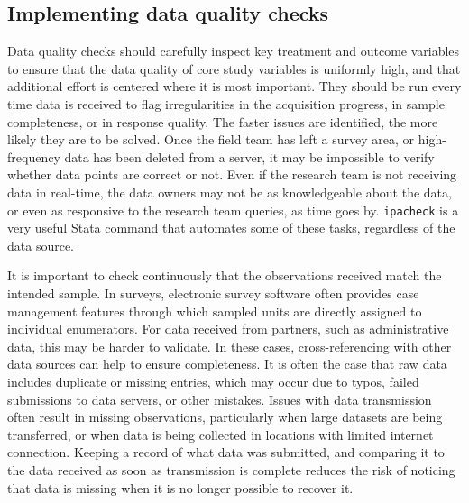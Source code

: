 \subsection{Implementing data quality checks}

Data quality checks should carefully inspect key treatment and outcome variables
to ensure that the data quality of core study variables is uniformly high,
and that additional effort is centered where it is most important.
They should be run every time data is received
to flag irregularities in the acquisition progress, in sample completeness, or in response quality.
The faster issues are identified, the more likely they are to be solved.
Once the field team has left a survey area,
or high-frequency data has been deleted from a server,
it may be impossible to verify whether data points are correct or not.
Even if the research team is not receiving data in real-time,
the data owners may not be as knowledgeable about the data,
or even as responsive to the research team queries, as time goes by.
\texttt{ipacheck}
is a very useful Stata command that automates some of these tasks,
regardless of the data source.

It is important to check continuously that the observations received match the intended sample.
In surveys, electronic survey software often provides case management features
through which sampled units are directly assigned to individual enumerators.
For data received from partners, such as administrative data,
this may be harder to validate.
In these cases, cross-referencing with other data sources can help to ensure completeness.
It is often the case that raw data includes duplicate or missing entries,
which may occur due to typos, failed submissions to data servers,
or other mistakes.
Issues with data transmission often result in missing observations,
particularly when large datasets are being transferred,
or when data is being collected in locations with limited internet connection.
Keeping a record of what data was submitted,
and comparing it to the data received as soon as transmission is complete
reduces the risk of noticing that data is missing when it is no longer possible to recover it.

